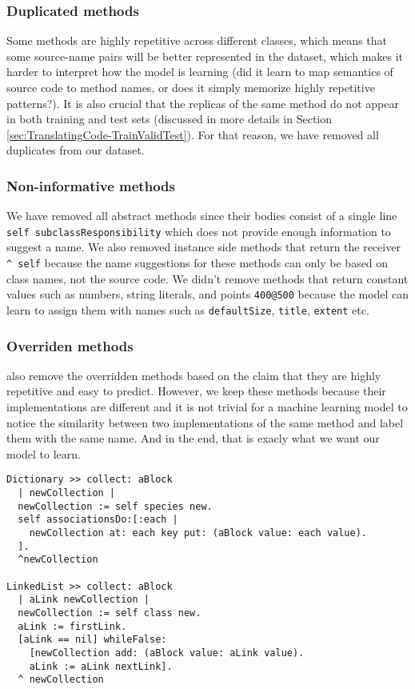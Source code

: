 \subsubsection{Duplicated methods}
\label{sec:TranslatingCode-Duplicate}

Some methods are highly repetitive across different classes, which means that some source-name pairs will be better represented in the dataset, which makes it harder to interpret how the model is learning (did it learn to map semantics of source code to method names, or does it simply memorize highly repetitive patterns?). It is also crucial that the replicas of the same method do not appear in both training and test sets (discussed in more details in Section \ref{sec:TranslatingCode-TrainValidTest}). For that reason, we have removed all duplicates from our dataset.

\subsubsection{Non-informative methods}

We have removed all abstract methods since their bodies consist of a single line \lstinline{self subclassResponsibility} which does not provide enough information to suggest a name. We also removed instance side methods that return the receiver \lstinline{^ self} because the name suggestions for these methods can only be based on class names, not the source code. We didn't remove methods that return constant values such as numbers, string literals, and points \lstinline{400@500} because the model can learn to assign them with names such as \lstinline{defaultSize}, \lstinline{title}, \lstinline{extent} etc.

\subsubsection{Overriden methods}

\cite{Alla16} also remove the overridden methods based on the claim that they are highly repetitive and easy to predict. However, we keep these methods because their implementations are different and it is not trivial for a machine learning model to notice the similarity between two implementations of the same method and label them with the same name. And in the end, that is exacly what we want our model to learn.

\begin{lstlisting}
Dictionary >> collect: aBlock
  | newCollection |
  newCollection := self species new.
  self associationsDo:[:each |
    newCollection at: each key put: (aBlock value: each value).
  ].
  ^newCollection

LinkedList >> collect: aBlock
  | aLink newCollection |
  newCollection := self class new.
  aLink := firstLink.
  [aLink == nil] whileFalse:
    [newCollection add: (aBlock value: aLink value).
    aLink := aLink nextLink].
  ^ newCollection
\end{lstlisting}

